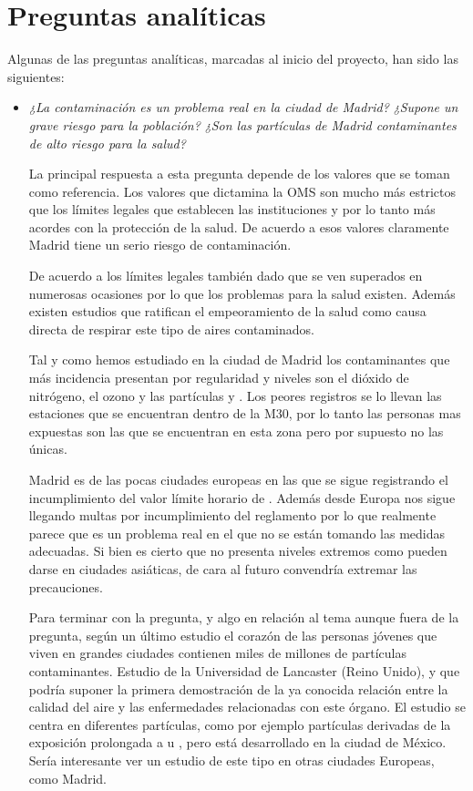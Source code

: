 \section{Preguntas analíticas}

Algunas de las preguntas analíticas, marcadas al inicio del proyecto, han sido las siguientes:

\begin{itemize}
	\item \textit{¿La contaminación es un problema real en la ciudad de Madrid?} \textit{¿Supone un grave riesgo para la población?} \textit{¿Son las partículas de Madrid contaminantes de alto riesgo para la salud?}
	
	La principal respuesta a esta pregunta depende de los valores que se toman como referencia. Los valores que dictamina la OMS \cite{oms_2} son mucho más estrictos que los límites legales que establecen las instituciones y por lo tanto más acordes con la protección de la salud. De acuerdo a esos valores claramente Madrid tiene un serio riesgo de contaminación. 
	
	De acuerdo a los límites legales también dado que se ven superados en numerosas ocasiones por lo que los problemas para la salud existen. Además existen estudios \cite{ambiente_contaminacion_estudio} que ratifican el empeoramiento de la salud como causa directa de respirar este tipo de aires contaminados.
	
	Tal y como hemos estudiado en la ciudad de Madrid  los contaminantes que más incidencia presentan por regularidad y niveles son el dióxido de nitrógeno, el ozono  y las partículas  y . Los peores registros se lo llevan las estaciones que se encuentran dentro de la M30, por lo tanto las personas mas expuestas son las que se encuentran en esta zona pero por supuesto no las únicas.
	
	Madrid es de las pocas ciudades europeas en las que se sigue registrando el incumplimiento del valor límite horario de . Además desde Europa nos sigue llegando multas \cite{bruselas_} por incumplimiento del reglamento por lo que realmente parece que es un problema real en el que no se están tomando las medidas adecuadas. Si bien es cierto que no presenta niveles extremos como pueden darse en ciudades asiáticas, de cara al futuro convendría extremar las precauciones.
	
	Para terminar con la pregunta, y algo en relación al tema aunque fuera de la pregunta, según un último estudio \cite{calderon_garciduenas_combustion_2019} el corazón de las personas jóvenes que viven en grandes ciudades contienen miles de millones de partículas contaminantes. Estudio de la Universidad de Lancaster (Reino Unido), y que podría suponer la primera demostración de la ya conocida relación entre la calidad del aire y las enfermedades relacionadas con este órgano. El estudio se centra en diferentes partículas, como por ejemplo partículas derivadas de la exposición prolongada a  u , pero está desarrollado en la ciudad de México. Sería interesante ver un estudio de este tipo en otras ciudades Europeas, como Madrid.
	

\end{itemize}
